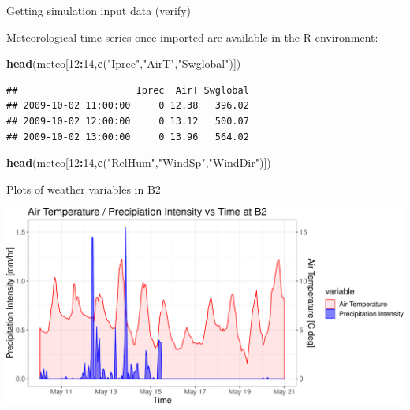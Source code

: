 \documentclass[ignorenonframetext,]{beamer}
\newenvironment{Shaded}{\begin{snugshade}}{\end{snugshade}}
\newcommand{\KeywordTok}[1]{\textcolor[rgb]{0.13,0.29,0.53}{\textbf{#1}}}
\newcommand{\DecValTok}[1]{\textcolor[rgb]{0.00,0.00,0.81}{#1}}
\newcommand{\StringTok}[1]{\textcolor[rgb]{0.31,0.60,0.02}{#1}}
\newcommand{\OperatorTok}[1]{\textcolor[rgb]{0.81,0.36,0.00}{\textbf{#1}}}
\newcommand{\NormalTok}[1]{#1}
\begin{document}
\begin{frame}[fragile]{Getting simulation input data (verify)}

Meteorological time series once imported are available in the R
environment:

\begin{Shaded}
\begin{Highlighting}[]
\KeywordTok{head}\NormalTok{(meteo[}\DecValTok{12}\OperatorTok{:}\DecValTok{14}\NormalTok{,}\KeywordTok{c}\NormalTok{(}\StringTok{"Iprec"}\NormalTok{,}\StringTok{"AirT"}\NormalTok{,}\StringTok{"Swglobal"}\NormalTok{)])}
\end{Highlighting}
\end{Shaded}

\begin{verbatim}
##                     Iprec  AirT Swglobal
## 2009-10-02 11:00:00     0 12.38   396.02
## 2009-10-02 12:00:00     0 13.12   500.07
## 2009-10-02 13:00:00     0 13.96   564.02
\end{verbatim}

\begin{Shaded}
\begin{Highlighting}[]
\KeywordTok{head}\NormalTok{(meteo[}\DecValTok{12}\OperatorTok{:}\DecValTok{14}\NormalTok{,}\KeywordTok{c}\NormalTok{(}\StringTok{"RelHum"}\NormalTok{,}\StringTok{"WindSp"}\NormalTok{,}\StringTok{"WindDir"}\NormalTok{)])}
\end{Highlighting}
\end{Shaded}

\end{frame}

\begin{frame}{Plots of weather variables in B2}

\includegraphics{presentation_files/figure-beamer/unnamed-chunk-6-1.pdf}

\end{frame}
\end{document}
